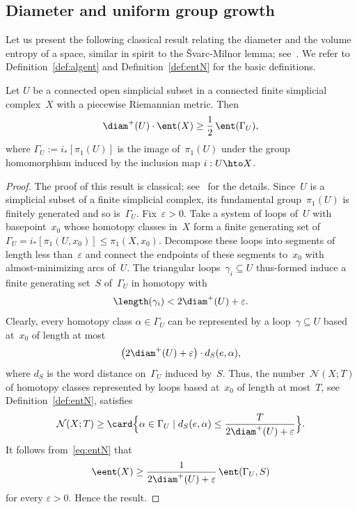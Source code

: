 \subsection{Diameter and uniform group growth}

Let us present the following classical result relating the diameter and the volume entropy of a space, similar in spirit to the \v{S}varc-Milnor lemma; see~\cite[\S5.16]{gro99}.
We refer to Definition~\ref{def:algent} and Definition~\ref{def:entN} for the basic definitions.

\begin{proposition}\label{prop:diam-ent}
Let $U$ be a connected open simplicial subset in a connected finite simplicial complex~$X$ with a piecewise Riemannian metric.
Then
\[
\diam^+(U) \cdot \ent(X) \geq \frac{1}{2} \, \ent(\Gamma_U),
\]
where $\Gamma_U := i_*[\pi_1(U)]$ is the image of~$\pi_1(U)$ under the group homomorphism induced by the inclusion map $i:U \hto X$.
\end{proposition}

\begin{proof}
The proof of this result is classical; see~\cite[Prop.\,3.22]{gro99} for the details.
Since~$U$ is a simplicial subset of a finite simplicial complex, its fundamental group~$\pi_1(U)$ is finitely generated and so is~$\Gamma_U$.
Fix~$\varepsilon >0$.
Take a system of loops of~$U$ with basepoint~$x_0$ whose homotopy classes in~$X$ form a finite generating set of~$\Gamma_U = i_*[\pi_1(U,x_0)] \leqslant \pi_1(X,x_0)$.
Decompose these loops into segments of length less than~$\varepsilon$ and connect the endpoints of these segments to~$x_0$ with almost-minimizing arcs of~$U$.
The triangular loops~$\gamma_ i \subseteq U$ thus-formed induce a finite generating set~$S$ of~$\Gamma_U$ in homotopy with
\[
\length(\gamma_i) < 2 \diam^+(U) + \varepsilon.
\]
Clearly, every homotopy class $\alpha \in \Gamma_U$ can be represented by a loop~$\gamma \subseteq U$ based at~$x_0$ of length at most
\[
\bigl(2 \diam^+(U) + \varepsilon\bigr) \cdot d_S(e,\alpha),
\]
where $d_S$ is the word distance on~$\Gamma_U$ induced by~$S$.
Thus, the number~$\mathcal{N}(X;T)$ of homotopy classes represented by loops based at~$x_0$ of length at most~$T$, see Definition~\ref{def:entN}, satisfies
\[
\mathcal{N}(X;T) \geq \card \Bigl\{\alpha \in\Gamma_U \mid d_S(e,\alpha) \leq \frac{T}{2 \diam^+(U) + \varepsilon} \Bigr\}.
\]
It follows from~\eqref{eq:entN} that
\[
\eent(X) \geq \frac{1}{2 \diam^+(U) + \varepsilon} \, \ent(\Gamma_U,S)
\]
for every $\varepsilon >0$.
Hence the result.
\end{proof}

